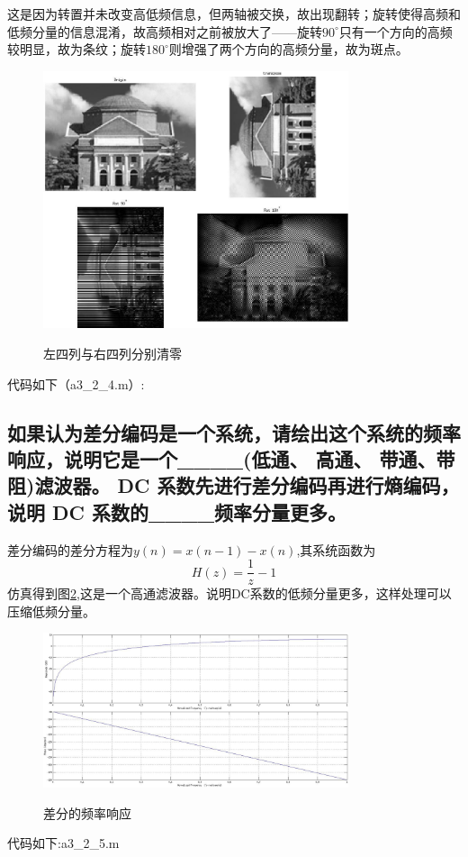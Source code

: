 \documentclass{ctexart}
\begin{document}
这是因为转置并未改变高低频信息，但两轴被交换，故出现翻转；旋转使得高频和低频分量的信息混淆，故高频相对之前被放大了——旋转$90^{\circ}$只有一个方向的高频较明显，故为条纹；旋转$180^{\circ}$则增强了两个方向的高频分量，故为斑点。
\begin{figure}
    \centering
    \includegraphics[width=0.8\textwidth]{a3_2_4.jpg}\\
    \caption{左四列与右四列分别清零\label{a324}}
\end{figure}

代码如下（a3\_2\_4.m）:

\subsection{
如果认为差分编码是一个系统，请绘出这个系统的频率响应，说明它是一个\_\_\_\_(低通、 高通、 带通、带阻)滤波器。 DC 系数先进行差分编码再进行熵编码，说明 DC 系数的\_\_\_\_频率分量更多。}
差分编码的差分方程为$y(n)=x(n-1)-x(n)$,其系统函数为\[H(z)=\frac{1}{z}-1\]仿真得到图\ref{a325},这是一个高通滤波器。说明DC系数的低频分量更多，这样处理可以压缩低频分量。
\begin{figure}
    \centering
    \includegraphics[width=0.8\textwidth]{a3_2_5.jpg}\\
    \caption{差分的频率响应\label{a325}}
\end{figure}
代码如下:{a3\_2\_5.m}

\end{document}

